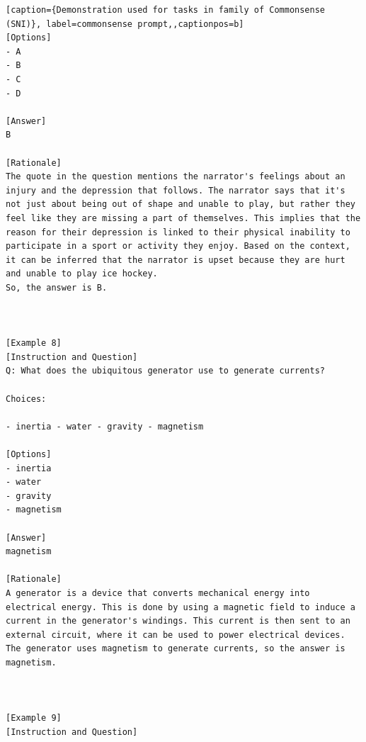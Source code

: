 \begin{lstlisting}[caption={Demonstration used for tasks in family of Commonsense (SNI)}, label=commonsense prompt,,captionpos=b]
[Options]
- A
- B
- C
- D

[Answer]
B

[Rationale]
The quote in the question mentions the narrator's feelings about an injury and the depression that follows. The narrator says that it's not just about being out of shape and unable to play, but rather they feel like they are missing a part of themselves. This implies that the reason for their depression is linked to their physical inability to participate in a sport or activity they enjoy. Based on the context, it can be inferred that the narrator is upset because they are hurt and unable to play ice hockey.
So, the answer is B.



[Example 8]
[Instruction and Question]
Q: What does the ubiquitous generator use to generate currents?

Choices:

- inertia - water - gravity - magnetism

[Options]
- inertia
- water
- gravity
- magnetism

[Answer]
magnetism

[Rationale]
A generator is a device that converts mechanical energy into electrical energy. This is done by using a magnetic field to induce a current in the generator's windings. This current is then sent to an external circuit, where it can be used to power electrical devices. The generator uses magnetism to generate currents, so the answer is magnetism.



[Example 9]
[Instruction and Question]

    \end{lstlisting}


